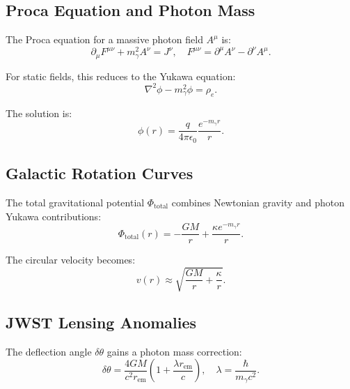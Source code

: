 \documentclass[12pt, a4paper]{article}
\begin{document}
\subsection{Proca Equation and Photon Mass}
\label{subsec:proca}

The Proca equation for a massive photon field \( A^\mu \) is:
\begin{equation}
\partial_\mu F^{\mu\nu} + m_\gamma^2 A^\nu = J^\nu, \quad F^{\mu\nu} = \partial^\mu A^\nu - \partial^\nu A^\mu.
\label{eq:proca}
\end{equation}

For static fields, this reduces to the Yukawa equation:
\begin{equation}
\nabla^2 \phi - m_\gamma^2 \phi = \rho_e.
\label{eq:yukawa}
\end{equation}

The solution is:
\begin{equation}
\phi(r) = \frac{q}{4\pi \epsilon_0} \frac{e^{-m_\gamma r}}{r}.
\label{eq:yukawa_sol}
\end{equation}

\subsection{Galactic Rotation Curves}
\label{subsec:rotation}

The total gravitational potential \( \Phi_{\text{total}} \) combines Newtonian gravity and photon Yukawa contributions:
\begin{equation}
\Phi_{\text{total}}(r) = -\frac{GM}{r} + \frac{\kappa e^{-m_\gamma r}}{r}.
\label{eq:total_potential}
\end{equation}

The circular velocity becomes:
\begin{equation}
v(r) \approx \sqrt{\frac{GM}{r} + \frac{\kappa}{r}}.
\label{eq:velocity}
\end{equation}

\subsection{JWST Lensing Anomalies}
\label{subsec:lensing}

The deflection angle \( \delta \theta \) gains a photon mass correction:
\begin{equation}
\delta \theta = \frac{4GM}{c^2 r_{\text{em}}} \left(1 + \frac{\lambda r_{\text{em}}}{c}\right), \quad \lambda = \frac{\hbar}{m_\gamma c^2}.
\label{eq:lensing}
\end{equation}
\end{document}
